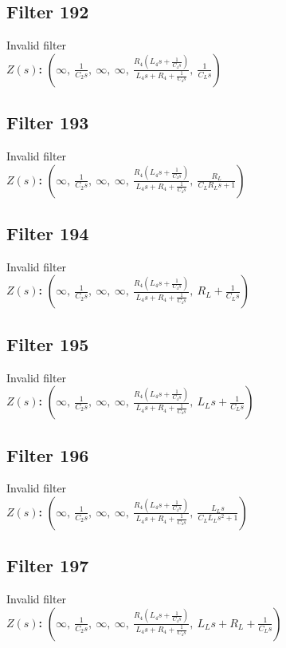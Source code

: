 \documentclass{article}
\begin{document}
\subsection*{Filter 192}
Invalid filter \\ 
\textbf{$Z(s)$:} $\left( \infty, \  \frac{1}{C_{2} s}, \  \infty, \  \infty, \  \frac{R_{4} \left(L_{4} s + \frac{1}{C_{4} s}\right)}{L_{4} s + R_{4} + \frac{1}{C_{4} s}}, \  \frac{1}{C_{L} s}\right)$ \\ 
\subsection*{Filter 193}
Invalid filter \\ 
\textbf{$Z(s)$:} $\left( \infty, \  \frac{1}{C_{2} s}, \  \infty, \  \infty, \  \frac{R_{4} \left(L_{4} s + \frac{1}{C_{4} s}\right)}{L_{4} s + R_{4} + \frac{1}{C_{4} s}}, \  \frac{R_{L}}{C_{L} R_{L} s + 1}\right)$ \\ 
\subsection*{Filter 194}
Invalid filter \\ 
\textbf{$Z(s)$:} $\left( \infty, \  \frac{1}{C_{2} s}, \  \infty, \  \infty, \  \frac{R_{4} \left(L_{4} s + \frac{1}{C_{4} s}\right)}{L_{4} s + R_{4} + \frac{1}{C_{4} s}}, \  R_{L} + \frac{1}{C_{L} s}\right)$ \\ 
\subsection*{Filter 195}
Invalid filter \\ 
\textbf{$Z(s)$:} $\left( \infty, \  \frac{1}{C_{2} s}, \  \infty, \  \infty, \  \frac{R_{4} \left(L_{4} s + \frac{1}{C_{4} s}\right)}{L_{4} s + R_{4} + \frac{1}{C_{4} s}}, \  L_{L} s + \frac{1}{C_{L} s}\right)$ \\ 
\subsection*{Filter 196}
Invalid filter \\ 
\textbf{$Z(s)$:} $\left( \infty, \  \frac{1}{C_{2} s}, \  \infty, \  \infty, \  \frac{R_{4} \left(L_{4} s + \frac{1}{C_{4} s}\right)}{L_{4} s + R_{4} + \frac{1}{C_{4} s}}, \  \frac{L_{L} s}{C_{L} L_{L} s^{2} + 1}\right)$ \\ 
\subsection*{Filter 197}
Invalid filter \\ 
\textbf{$Z(s)$:} $\left( \infty, \  \frac{1}{C_{2} s}, \  \infty, \  \infty, \  \frac{R_{4} \left(L_{4} s + \frac{1}{C_{4} s}\right)}{L_{4} s + R_{4} + \frac{1}{C_{4} s}}, \  L_{L} s + R_{L} + \frac{1}{C_{L} s}\right)$ \\ 
\end{document}
